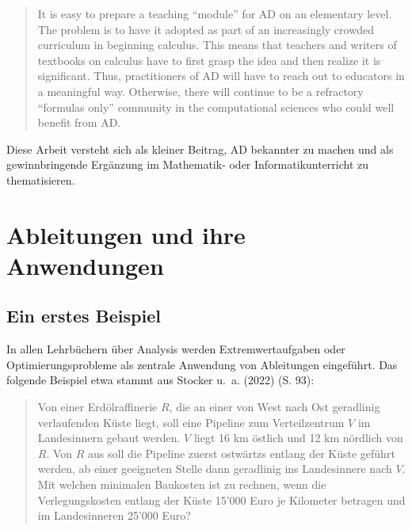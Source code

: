 \documentclass[
  a4paper,
  DIV=11]{scrreprt}
\theoremstyle{definition}
\theoremstyle{definition}
\theoremstyle{remark}
\begin{document}
\begin{quote}
It is easy to prepare a teaching ``module'' for AD on an elementary
level. The problem is to have it adopted as part of an increasingly
crowded curriculum in beginning calculus. This means that teachers and
writers of textbooks on calculus have to first grasp the idea and then
realize it is significant. Thus, practitioners of AD will have to reach
out to educators in a meaningful way. Otherwise, there will continue to
be a refractory ``formulas only'' community in the computational
sciences who could well benefit from AD.
\end{quote}

Diese Arbeit versteht sich als kleiner Beitrag, AD bekannter zu machen
und als gewinnbringende Ergänzung im Mathematik- oder
Informatikunterricht zu thematisieren.


\hypertarget{sec-AbleitungenUndAnwendungen}{%
\chapter{Ableitungen und ihre
Anwendungen}\label{sec-AbleitungenUndAnwendungen}}

\hypertarget{ein-erstes-beispiel}{%
\section{Ein erstes Beispiel}\label{ein-erstes-beispiel}}

In allen Lehrbüchern über Analysis werden Extremwertaufgaben oder
Optimierungsprobleme als zentrale Anwendung von Ableitungen eingeführt.
Das folgende Beispiel etwa stammt aus Stocker u.~a. (2022) (S. 93):

\begin{quote}
Von einer Erdölraffinerie \(R\), die an einer von West nach Ost
geradlinig verlaufenden Küste liegt, soll eine Pipeline zum
Verteilzentrum \(V\) im Landesinnern gebaut werden. \(V\) liegt 16 km
östlich und 12 km nördlich von \(R\). Von \(R\) aus soll die Pipeline
zuerst ostwärtzs entlang der Küste geführt werden, ab einer geeigneten
Stelle dann geradlinig ins Landesinnere nach \(V\). Mit welchen
minimalen Baukosten ist zu rechnen, wenn die Verlegungskosten entlang
der Küste 15'000 Euro je Kilometer betragen und im Landesinneren 25'000
Euro?
\end{quote}
\end{document}

